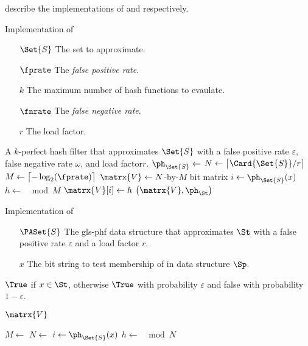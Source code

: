 \documentclass[ ../main.tex]{subfiles}
\begin{document}
 describe the implementations of \MakeApproxSet and \Contains respectively.
\begin{algorithm}[h]
    \caption{Implementation of \protect\MakeKPerfectHashSet}
    \label{alg:PHF}
    \KwIn
    {
        \begin{itemize}
            \item[$\Set{S}$] The set to approximate.
            \item[$\fprate$] The \emph{false positive rate}.
            \item[$k$] The maximum number of hash functions to evaulate.
            \item[$\fnrate$] The \emph{false negative rate}.
            \item[$r$] The load factor.
        \end{itemize}
    }
    \KwOut
    {
        A $k$-perfect hash filter that approximates $\Set{S}$ with a false positive rate $\varepsilon$, false negative rate $\omega$, and load factor$r$.
    }
    {
        $\ph_{\Set{S}} \gets$ \;
        $N \gets \left\lceil \Card{\Set{S}} / r \right\rceil$\;
        $M \gets \left\lceil -\log_2\!\left(\fprate\right) \right\rceil$\;
        $\matrx{V} \gets N$-by-$M$ bit matrix\;
        {
            $i \gets \ph_{\Set{S}}\!\left(x\right)$\;
            $h \gets$ $\mod M$\;
            $\matrx{V}\!\left[i\right] \gets h$\;
        }
        \Return $\left(\matrx{V}, \ph_{\St}\right)$\;
    }
\end{algorithm}
\begin{algorithm}[h]
    \caption{Implementation of \protect\Contains}
    \label{alg:PHF_has}
    \KwIn
    {
        \begin{enumerate}
            \item[$\PASet{S}$] The \gls{gls-phf} data structure that approximates $\St$ with a false positive rate $\varepsilon$ and a load factor $r$.
            \item[$x$] The bit string to test membership of in data structure $\Sp$.
        \end{enumerate}
    }
    \KwOut
    {
        $\True$ if $x \in \St$, otherwise $\True$ with probability $\varepsilon$ and false with probability $1 - \varepsilon$.
    }
    {
        $\matrx{V}$

        $M \gets$ \;
        $N \gets$ \;
        $i \gets \ph_{\Set{S}}\!\left(x\right)$\;
        $h \gets$ $ \mod N$\;
        \;
    }
\end{algorithm}
\end{document}
